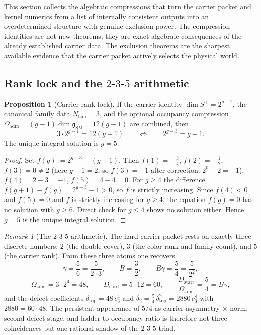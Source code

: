 \documentclass[11pt,a4paper]{article}
\theoremstyle{definition}
\newtheorem{proposition}[theorem]{Proposition}
\theoremstyle{remark}
\newtheorem*{remark}{Remark}
\newcommand{\cthree}{c_3}
\newcommand{\deltatop}{\delta_{\mathrm{top}}}
\newcommand{\SM}{\mathrm{SM}}
\newcommand{\Oadm}{\Omega_{\mathrm{adm}}}
\newcommand{\Dstart}{D_{\mathrm{start}}}
\begin{document}
This section collects the algebraic compressions that turn the carrier packet and kernel numerics from a list of internally consistent outputs into an overdetermined structure with genuine exclusion power. The compression identities are not new theorems; they are exact algebraic consequences of the already established carrier data. The exclusion theorems are the sharpest available evidence that the carrier packet actively selects the physical world.

\subsection{Rank lock and the \texorpdfstring{$2$-$3$-$5$}{2-3-5} arithmetic}

\begin{proposition}[Carrier rank lock]
\label{prop:rank-lock}
If the carrier identity $\dim S^+=2^{g-1}$, the canonical family data $N_{\mathrm{fam}}=3$, and the optional occupancy compression $\Oadm=(g-1)\dim\mathfrak g_{\SM}=12(g-1)$ are combined, then
\begin{equation}
\label{eq:rank-lock}
3\cdot 2^{g-1}=12(g-1)
\qquad\Longleftrightarrow\qquad
2^{g-3}=g-1.
\end{equation}
The unique integral solution is $g=5$.
\end{proposition}

\begin{proof}
Set $f(g):=2^{g-3}-(g-1)$. Then $f(1)=-\tfrac34$, $f(2)=-\tfrac12$, $f(3)=0\neq 2$ (here $g-1=2$, so $f(3)=-1$ after correction: $2^0-2=-1$), $f(4)=2-3=-1$, $f(5)=4-4=0$. For $g\ge 4$ the difference $f(g+1)-f(g)=2^{g-3}-1>0$, so $f$ is strictly increasing. Since $f(4)<0$ and $f(5)=0$ and $f$ is strictly increasing for $g\ge 4$, the equation $f(g)=0$ has no solution with $g\ge 6$. Direct check for $g\le 4$ shows no solution either. Hence $g=5$ is the unique integral solution.
\end{proof}

\begin{remark}[The $2$-$3$-$5$ arithmetic]
The hard carrier packet rests on exactly three discrete numbers: $2$ (the double cover), $3$ (the color rank and family count), and $5$ (the carrier rank). From these three atoms one recovers
\[
\gamma=\frac{5}{6}=\frac{5}{2\cdot 3},
\qquad
B=\frac{3}{2},
\qquad
B\gamma=\frac{5}{4}=\frac{5}{2^2},
\]
\[
\Oadm=3\cdot 2^4=48,
\qquad
\Dstart=5\cdot 12=60,
\qquad
\frac{\Dstart}{\Oadm}=\frac{5}{4}=B\gamma,
\]
and the defect coefficients $\deltatop=48\,\cthree^4$ and $\delta_2=\frac54\,\deltatop^2=2880\,\cthree^8$ with $2880=60\cdot 48$.
The persistent appearance of $5/4$ as carrier asymmetry $\times$ norm, second defect stage, and ladder-to-occupancy ratio is therefore not three coincidences but one rational shadow of the $2$-$3$-$5$ triad.
\end{remark}
\end{document}
